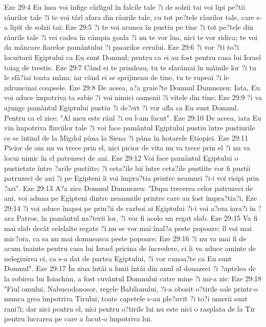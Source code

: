 Eze 29:4  Eu însa voi înfige cârligul în falcile tale ?i de solzii tai voi lipi pe?tii râurilor tale ?i te voi târî afara din râurile tale, cu tot pe?tele râurilor tale, care s-a lipit de solzii tai;
Eze 29:5  ?i te voi arunca în pustiu pe tine ?i tot pe?tele din râurile tale ?i vei cadea în câmpia goala ?i nu te vor lua, nici te vor ridica; te voi da mâncare fiarelor pamântului ?i pasarilor cerului.
Eze 29:6  ?i vor ?ti to?i locuitorii Egiptului ca Eu sunt Domnul; pentru ca ei au fost pentru casa lui Israel toiag de trestie.
Eze 29:7  Când ei te prindeau, tu te sfarâmai în mâinile lor ?i tu le sfâ?iai toata mâna; iar când ei se sprijineau de tine, tu te rupeai ?i le zdruncinai coapsele.
Eze 29:8  De aceea, a?a graie?te Domnul Dumnezeu: Iata, Eu voi aduce împotriva ta sabie ?i voi nimici oamenii ?i vitele din tine;
Eze 29:9  ?i va ajunge pamântul Egiptului pustiu ?i de?ert ?i vor afla ca Eu sunt Domnul. Pentru ca el zice: "Al meu este râul ?i eu l-am facut".
Eze 29:10  De aceea, iata Eu vin împotriva fluviilor tale ?i voi face pamântul Egiptului pustiu între pustiurile ce se întind de la Migdol pâna la Siena ?i pâna în hotarele Etiopiei.
Eze 29:11  Picior de om nu va trece prin el, nici picior de vita nu va trece prin el ?i nu va locui nimic în el patruzeci de ani.
Eze 29:12  Voi face pamântul Egiptului o pustietate între ?arile pustiite; ?i ceta?ile lui între ceta?ile pustiite vor fi pustii patruzeci de ani ?i pe Egipteni îi voi împra?tia printre neamuri ?i-i voi risipi prin ?ari".
Eze 29:13  A?a zice Domnul Dumnezeu: "Dupa trecerea celor patruzeci de ani, voi aduna pe Egipteni dintre neamurile printre care au fost împra?tia?i,
Eze 29:14  ?i voi aduce înapoi pe prin?ii de razboi ai Egiptului ?i-i voi a?eza iara?i în ?ara Patros, în pamântul na?terii lor, ?i vor fi acolo un regat slab.
Eze 29:15  Va fi mai slab decât celelalte regate ?i nu se vor mai înal?a peste popoare; îl voi mai mic?ora, ca sa nu mai domneasca peste popoare;
Eze 29:16  ?i nu va mai fi de acum înainte pentru casa lui Israel pricina de încredere, ci îi va aduce aminte de nelegiuirea ei, ca s-a dat de partea Egiptului, ?i vor cunoa?te ca Eu sunt Domnul".
Eze 29:17  În ziua întâi a lunii întâi din anul al douazeci ?i ?aptelea de la robirea lui Ioiachim, a fost cuvântul Domnului catre mine ?i mi-a zis:
Eze 29:18  "Fiul omului, Nabucodonosor, regele Babilonului, ?i-a obosit o?tirile sale printr-o munca grea împotriva Tirului; toate capetele s-au ple?uvit ?i to?i umerii sunt rani?i; dar nici pentru el, nici pentru o?tirile lui nu este nici o rasplata de la Tir pentru lucrarea pe care a facut-o împotriva lui.
